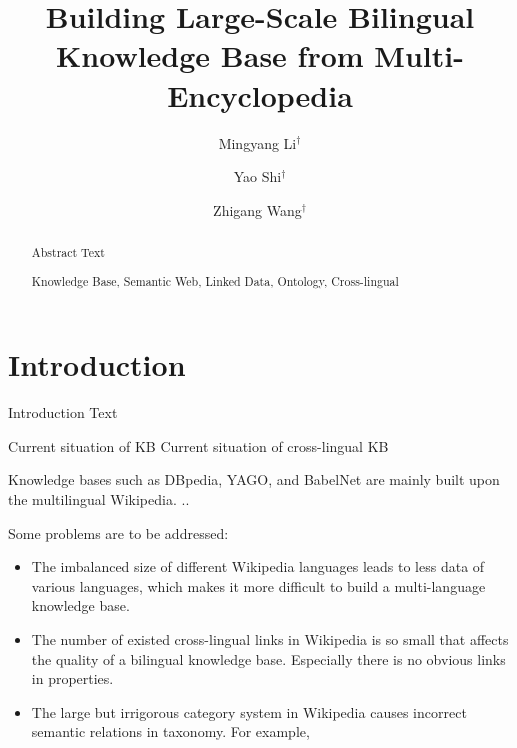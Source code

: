 \documentclass[runningheads,a4paper]{llncs}
\newcommand{\keywords}[1]{\par\addvspace\baselineskip\noindent\keywordname\enspace\ignorespaces#1}
\begin{document}
\mainmatter

\title{Building Large-Scale Bilingual Knowledge Base from Multi-Encyclopedia}
\author{Mingyang Li$^\dag$ \and Yao Shi$^\dag$ \and Zhigang Wang$^\dag$}


\maketitle

\begin{abstract}
    Abstract Text

\keywords{Knowledge Base, Semantic Web, Linked Data, Ontology, Cross-lingual}
\end{abstract}

\section{Introduction}

Introduction Text

Current situation of KB
Current situation of cross-lingual KB 

Knowledge bases such as DBpedia, YAGO, and BabelNet are mainly built upon the multilingual Wikipedia. ..

Some problems are to be addressed:
\begin{itemize}
  \item The imbalanced size of different Wikipedia languages leads to less data of various languages, which makes it more difficult to build a multi-language knowledge base.
  \item The number of existed cross-lingual links in Wikipedia is so small that affects the quality of a bilingual knowledge base. Especially there is no obvious links in properties.
  \item The large but irrigorous category system in Wikipedia causes incorrect semantic relations in taxonomy. For example, 
\end{itemize}
\end{document}
